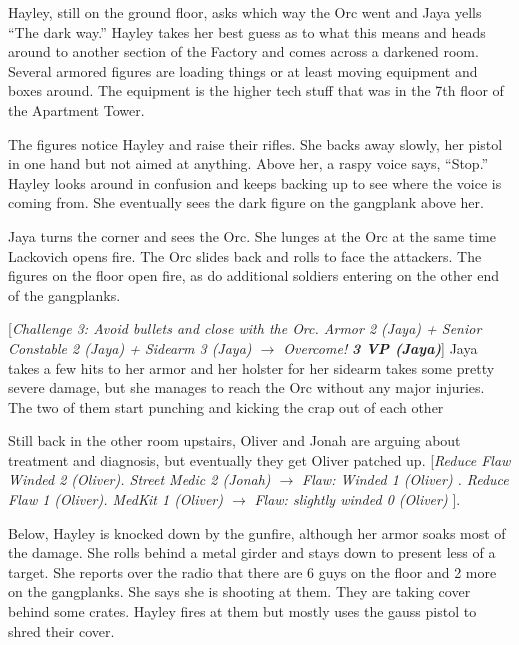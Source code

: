 Hayley, still on the ground floor, asks which way the Orc went and Jaya yells ``The dark way.''  Hayley takes her best guess as to what this means and heads around to another section of the Factory and comes across a darkened room.  Several armored figures are loading things or at least moving equipment and boxes around.  The equipment is the higher tech stuff that was in the 7th floor of the Apartment Tower.



The figures notice Hayley and raise their rifles.  She backs away slowly, her pistol in one hand but not aimed at anything.  Above her, a raspy voice says, ``Stop.''  Hayley looks around in confusion and keeps backing up to see where the voice is coming from.  She eventually sees the dark figure on the gangplank above her.



Jaya turns the corner and sees the Orc.  She lunges at the Orc at the same time Lackovich opens fire.  The Orc slides back and rolls to face the attackers.  The figures on the floor open fire, as do additional soldiers entering on the other end of the gangplanks.



{[}\textit{Challenge 3: Avoid bullets and close with the Orc.  Armor 2 (Jaya) + Senior Constable 2 (Jaya) + Sidearm 3 (Jaya)  $\rightarrow$ Overcome! }\textit{\textbf{3 VP (Jaya)}}{]}  Jaya takes a few hits to her armor and her holster for her sidearm takes some pretty severe damage, but she manages to reach the Orc without any major injuries.   The two of them start punching and kicking the crap out of each other



Still back in the other room upstairs, Oliver and Jonah are arguing about treatment and diagnosis, but eventually they get Oliver patched up. {[}\textit{Reduce Flaw Winded 2 (Oliver).  Street Medic 2 (Jonah) $\rightarrow$ }\textit{Flaw: Winded 1 (Oliver)}\textit{ {\color[RGB]{255,0,0}. } }\textit{ }\textit{Reduce Flaw 1 (Oliver).  MedKit 1 (Oliver) $\rightarrow$ }\textit{ {\color[RGB]{255,0,0}Flaw: slightly winded 0 (Oliver)} }{]}.  



Below, Hayley is knocked down by the gunfire, although her armor soaks most of the damage.  She rolls behind a metal girder and stays down to present less of a target.  She reports over the radio that there are 6 guys on the floor and 2 more on the gangplanks.  She says she is shooting at them.  They are taking cover behind some crates.  Hayley fires at them but mostly uses the gauss pistol to shred their cover.



